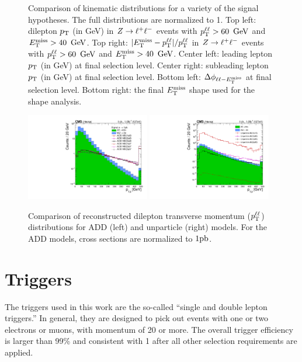 \begin{figure}[htbp]
  \caption{Comparison of kinematic distributions for a variety of the signal hypotheses. The full distributions are normalized to 1.
  Top left: dilepton $p_{\mathrm{T}}$ (in GeV) in $Z\to\ell^+\ell^-$ events with $p_{\mathrm{T}}^{\ell\ell} > 60~\,\text{Ge\hspace{-.08em}V}$ and $E_\mathrm{T}^{\mathrm{miss}} > 40~\,\text{Ge\hspace{-.08em}V}$. Top right: 
  $|E_\mathrm{T}^{\mathrm{miss}}-p_{\mathrm{T}}^{\ell\ell}|/p_{\mathrm{T}}^{\ell\ell}$ in $Z\to\ell^+\ell^-$ events with $p_{\mathrm{T}}^{\ell\ell} > 60~\,\text{Ge\hspace{-.08em}V}$ and $E_\mathrm{T}^{\mathrm{miss}} > 40~\,\text{Ge\hspace{-.08em}V}$.
  Center left: leading lepton $p_{\mathrm{T}}$ (in GeV) at final selection level. Center right: subleading lepton $p_{\mathrm{T}}$ (in GeV) at final selection level.
  Bottom left: $\Delta \phi_{\ell\ell-E_\mathrm{T}^{\mathrm{miss}}}$ at final selection level. Bottom right: the final $E_\mathrm{T}^{\mathrm{miss}}$ shape used for the shape analysis.}
  \label{fig:signals}
\end{figure}

\begin{figure}[htbp]
  \centering
  \includegraphics[width=0.48\textwidth]{figures/compare_add.pdf}
  \includegraphics[width=0.48\textwidth]{figures/compare_unparticle.pdf}
  \caption{
    Comparison of reconstructed dilepton transverse momentum ($p_{\mathrm{T}}^{\ell\ell}$) distributions for ADD (left) and unparticle (right) models.
    For the ADD models, cross sections are normalized to $1\mathrm{pb}$.
  }
  \label{fig:moreSignals}
\end{figure}

\section{Triggers}
The triggers used in this work are the so-called ``single and double lepton triggers.''
In general, they are designed to pick out events with one or two electrons or muons,
with momentum of 20 \GeV or more.
The overall trigger efficiency is larger than 99\% and consistent with 1 
after all other selection requirements are applied.

